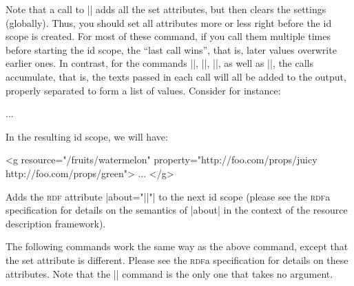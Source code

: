 Note that a call to |\pgfsys@begin@idscope| adds all the set attributes, but
then clears the settings (globally). Thus, you should set all attributes more
or less right before the id scope is created. For most of these command, if you
call them multiple times before starting the id scope, the ``last call wins'',
that is, later values overwrite earlier ones. In contrast, for the commands
|\pgfsys@rdf@property|, |\pgfsys@rdf@rel|, |\pgfsys@rdf@rev|, as well as
|\pgfsys@rdf@typeof|, the calls accumulate, that is, the texts passed in each
call will all be added to the output, properly separated to form a list of
values. Consider for instance:
%
\begin{codeexample}
\pgfsys@begin@idscope
  ...
\pgfsys@end@idscope
\end{codeexample}

In the resulting id scope, we will have:
%
\begin{codeexample}
<g resource="/fruits/watermelon"
   property="http://foo.com/props/juicy http://foo.com/props/green">
  ...
</g>
\end{codeexample}

\begin{command}{\pgfsys@rdf@about{}}
    Adds the \textsc{rdf} attribute |about="||"| to the next id
    scope (please see the \textsc{rdf}a specification for details on the
    semantics of |about| in the context of the resource description framework).
\end{command}

The following commands work the same way as the above command, except that the
set attribute is different. Please see the \textsc{rdf}a specification for
details on these attributes. Note that the |\pgfsys@rdf@inlist| command is the
only one that takes no argument.

\begin{command}{\pgfsys@rdf@content{}}
\end{command}

\begin{command}{\pgfsys@rdf@datatype{}}
\end{command}

\begin{command}{\pgfsys@rdf@href{}}
\end{command}

